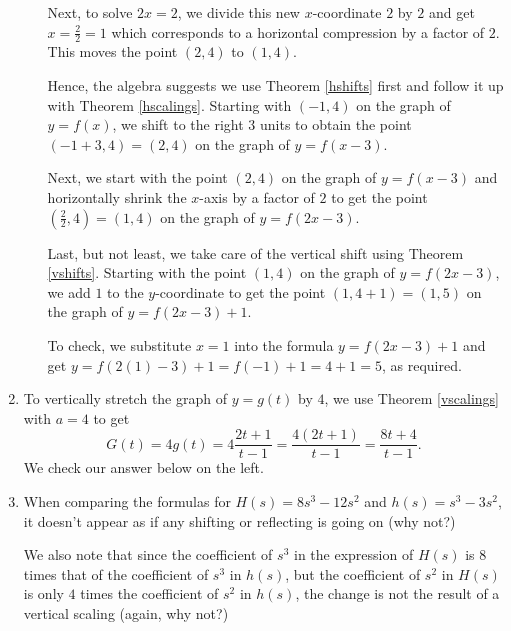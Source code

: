 \documentclass{ximera}
\begin{document}
\begin{example}
\begin{enumerate}
\begin{enumerate}
 \smallskip
 
 Next, to solve $2x=2$, we divide this new $x$-coordinate $2$  by $2$ and get $x = \frac{2}{2}=1$  which corresponds to a horizontal compression by a factor of $2$.  This moves the point $(2,4)$ to $(1,4)$.  
 
 
 \smallskip
 
 
Hence, the algebra suggests we use Theorem \ref{hshifts} first and follow it up with Theorem \ref{hscalings}.  Starting with $(-1,4)$ on the graph of $y=f(x)$, we shift to the right $3$ units to obtain the point $(-1+3, 4) = (2,4)$ on the graph of $y=f(x-3)$. 

\smallskip

 Next, we start with the point $(2,4)$ on the graph of $y=f(x-3)$ and horizontally shrink the $x$-axis by a factor of $2$ to get the point $\left(\frac{2}{2}, 4\right) = (1,4)$ on the graph of $y=f(2x-3)$. 
 
 \smallskip
 
  Last, but not least, we take care of the vertical shift using Theorem \ref{vshifts}.  Starting with the point $(1,4)$ on the graph of $y=f(2x-3)$, we add $1$ to the $y$-coordinate to get the point  $(1,4+1) = (1,5)$ on the graph of $y = f(2x-3)+1$.   
  
  \smallskip
  
  To check, we substitute $x=1$ into  the formula $y = f(2x-3)+1$ and get $y = f(2(1)-3)+1 = f(-1)+1 = 4+1 = 5$, as required.


 \end{enumerate}
 
 
 \item  To vertically stretch the graph of $y=g(t)$ by $4$, we use Theorem \ref{vscalings} with $a=4$ to get \[G(t) = 4 g(t) = 4 \dfrac{2t+1}{t-1} = \dfrac{4(2t+1)}{t-1} = \dfrac{8t+4}{t-1}.\]  We check our answer below on the left.
   
 \item  When comparing the formulas for $H(s) = 8s^3 - 12s^2$ and $h(s) = s^3-3s^2$, it doesn't appear as if any shifting or reflecting is going on (why not?)   
 
 \smallskip
 
 We also note that since the coefficient of $s^3$ in the expression of $H(s)$ is $8$ times that of the coefficient of $s^3$ in $h(s)$, but the coefficient of $s^2$ in $H(s)$ is only $4$ times the coefficient of $s^2$ in $h(s)$, the change is not the result of a vertical scaling (again, why not?)  
 
 \smallskip
 

\end{enumerate}
\end{example}
\end{document}
